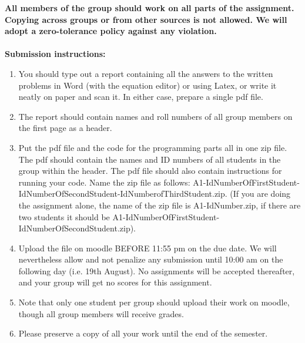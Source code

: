 \documentclass[11pt]{article}
\begin{document}
\maketitle

\textbf{All members of the group should work on all parts of the assignment. Copying across groups or from other sources is not allowed. We will adopt a \textbf{zero-tolerance policy} against any violation.}
\\
\\
\textbf{Submission instructions:} 
\begin{enumerate}
\item You should type out a report containing all the answers to the written problems in Word (with the equation editor) or using Latex, or write it neatly on paper and scan it. In either case, prepare a single pdf file. 
\item The report should contain names and roll numbers of all group members on the first page as a header.
\item Put the pdf file and the code for the programming parts all in one zip file. The pdf should contain the names and ID numbers of all students in the group within the header. The pdf file should also contain instructions for running your code. Name the zip file as follows: A1-IdNumberOfFirstStudent-IdNumberOfSecondStudent-IdNumberofThirdStudent.zip. (If you are doing the assignment alone, the name of the zip file is A1-IdNumber.zip, if there are two students it should be A1-IdNumberOfFirstStudent-IdNumberOfSecondStudent.zip). 
\item Upload the file on moodle BEFORE 11:55 pm on the due date. We will nevertheless allow and not penalize any submission until 10:00 am on the following day (i.e. 19th August). No assignments will be accepted thereafter, and your group will get no scores for this assignment. 
\item Note that only one student per group should upload their work on moodle, though all group members will receive grades. 
\item Please preserve a copy of all your work until the end of the semester. 
\end{enumerate}
\end{document}
